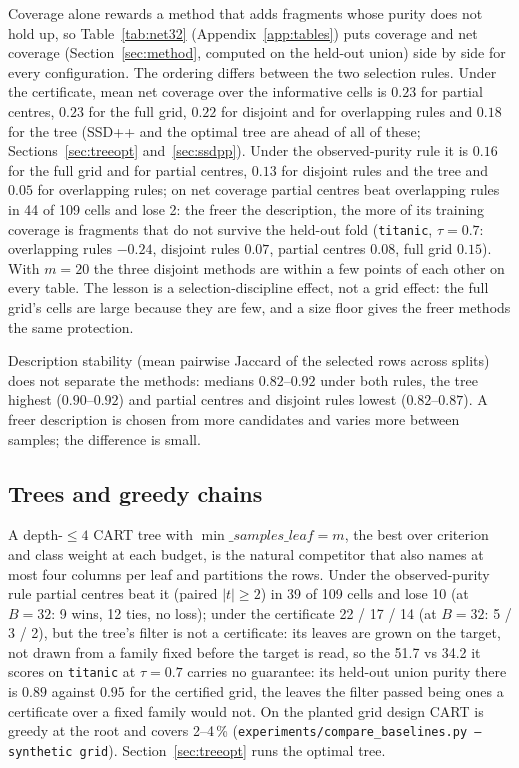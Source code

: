 \documentclass[11pt]{article}
\begin{document}
Coverage alone rewards a method that adds fragments whose purity does not hold up, so Table~\ref{tab:net32} (Appendix~\ref{app:tables}) puts coverage and net coverage (Section~\ref{sec:method}, computed on the held-out union) side by side for every configuration. The ordering differs between the two selection rules. Under the certificate, mean net coverage over the informative cells is $0.23$ for partial centres, $0.23$ for the full grid, $0.22$ for disjoint and for overlapping rules and $0.18$ for the tree (SSD++ and the optimal tree are ahead of all of these; Sections~\ref{sec:treeopt} and~\ref{sec:ssdpp}). Under the observed-purity rule it is $0.16$ for the full grid and for partial centres, $0.13$ for disjoint rules and the tree and $0.05$ for overlapping rules; on net coverage partial centres beat overlapping rules in 44 of 109 cells and lose 2: the freer the description, the more of its training coverage is fragments that do not survive the held-out fold (\texttt{titanic}, $\tau=0.7$: overlapping rules $-0.24$, disjoint rules $0.07$, partial centres $0.08$, full grid $0.15$). With $m=20$ the three disjoint methods are within a few points of each other on every table. The lesson is a selection-discipline effect, not a grid effect: the full grid's cells are large because they are few, and a size floor gives the freer methods the same protection.

Description stability (mean pairwise Jaccard of the selected rows across splits) does not separate the methods: medians $0.82$--$0.92$ under both rules, the tree highest ($0.90$--$0.92$) and partial centres and disjoint rules lowest ($0.82$--$0.87$). A freer description is chosen from more candidates and varies more between samples; the difference is small.

\subsection{Trees and greedy chains}\label{sec:trees}
A depth-$\le4$ CART tree with $\min\_samples\_leaf=m$, the best over criterion and class weight at each budget, is the natural competitor that also names at most four columns per leaf and partitions the rows. Under the observed-purity rule partial centres beat it (paired $|t|\ge2$) in 39 of 109 cells and lose 10 (at $B=32$: 9 wins, 12 ties, no loss); under the certificate 22 / 17 / 14 (at $B=32$: 5 / 3 / 2), but the tree's filter is not a certificate: its leaves are grown on the target, not drawn from a family fixed before the target is read, so the 51.7 vs 34.2 it scores on \texttt{titanic} at $\tau=0.7$ carries no guarantee: its held-out union purity there is $0.89$ against $0.95$ for the certified grid, the leaves the filter passed being ones a certificate over a fixed family would not. On the planted grid design CART is greedy at the root and covers 2--4\,\% (\texttt{experiments/compare\_baselines.py --synthetic grid}). Section~\ref{sec:treeopt} runs the optimal tree.
\end{document}
